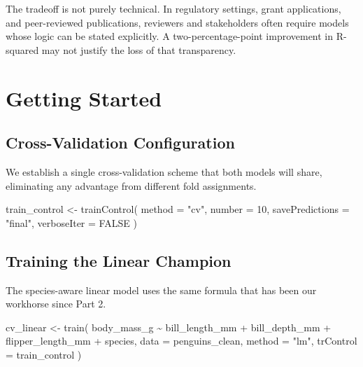 \documentclass[
  letterpaper,
  DIV=11,
  numbers=noendperiod]{scrartcl}
\newenvironment{Shaded}{\begin{snugshade}}{\end{snugshade}}
\newcommand{\AttributeTok}[1]{\textcolor[rgb]{0.40,0.45,0.13}{#1}}
\newcommand{\ConstantTok}[1]{\textcolor[rgb]{0.56,0.35,0.01}{#1}}
\newcommand{\DecValTok}[1]{\textcolor[rgb]{0.68,0.00,0.00}{#1}}
\newcommand{\FunctionTok}[1]{\textcolor[rgb]{0.28,0.35,0.67}{#1}}
\newcommand{\NormalTok}[1]{\textcolor[rgb]{0.00,0.23,0.31}{#1}}
\newcommand{\OtherTok}[1]{\textcolor[rgb]{0.00,0.23,0.31}{#1}}
\newcommand{\SpecialCharTok}[1]{\textcolor[rgb]{0.37,0.37,0.37}{#1}}
\newcommand{\StringTok}[1]{\textcolor[rgb]{0.13,0.47,0.30}{#1}}
\begin{document}
The tradeoff is not purely technical. In regulatory settings, grant
applications, and peer-reviewed publications, reviewers and stakeholders
often require models whose logic can be stated explicitly. A
two-percentage-point improvement in R-squared may not justify the loss
of that transparency.

\section{Getting Started}\label{getting-started}

\subsection{Cross-Validation
Configuration}\label{cross-validation-configuration}

We establish a single cross-validation scheme that both models will
share, eliminating any advantage from different fold assignments.

\begin{Shaded}
\begin{Highlighting}[]
\NormalTok{train\_control }\OtherTok{\textless{}{-}} \FunctionTok{trainControl}\NormalTok{(}
  \AttributeTok{method =} \StringTok{"cv"}\NormalTok{,}
  \AttributeTok{number =} \DecValTok{10}\NormalTok{,}
  \AttributeTok{savePredictions =} \StringTok{"final"}\NormalTok{,}
  \AttributeTok{verboseIter =} \ConstantTok{FALSE}
\NormalTok{)}
\end{Highlighting}
\end{Shaded}

\subsection{Training the Linear
Champion}\label{training-the-linear-champion}

The species-aware linear model uses the same formula that has been our
workhorse since Part 2.

\begin{Shaded}
\begin{Highlighting}[]
\NormalTok{cv\_linear }\OtherTok{\textless{}{-}} \FunctionTok{train}\NormalTok{(}
\NormalTok{  body\_mass\_g }\SpecialCharTok{\textasciitilde{}}\NormalTok{ bill\_length\_mm }\SpecialCharTok{+}\NormalTok{ bill\_depth\_mm }\SpecialCharTok{+}
\NormalTok{    flipper\_length\_mm }\SpecialCharTok{+}\NormalTok{ species,}
  \AttributeTok{data =}\NormalTok{ penguins\_clean,}
  \AttributeTok{method =} \StringTok{"lm"}\NormalTok{,}
  \AttributeTok{trControl =}\NormalTok{ train\_control}
\NormalTok{)}
\end{Highlighting}
\end{Shaded}
\end{document}

